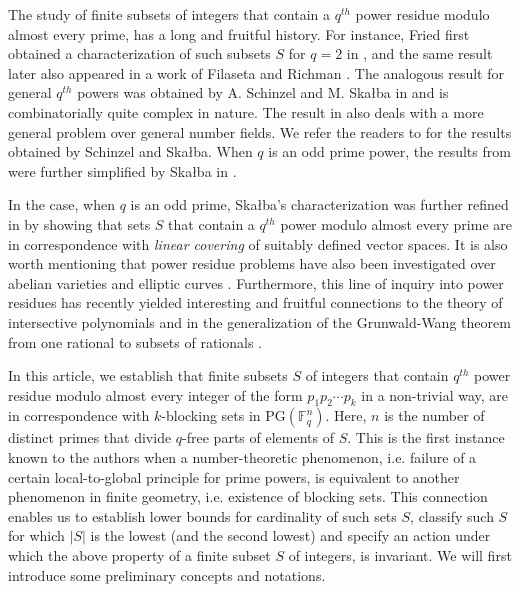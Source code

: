 \documentclass[12pt]{amsart}
\newcommand{\PG}{\mathrm{PG}}
\begin{document}
The study of finite subsets of integers that contain a $q^{th}$ power residue modulo almost every prime, has a long and fruitful history. For instance, Fried first obtained a characterization of such subsets $S$ for $q = 2$ in \cite{fried1969arithmetical}, and the same result later also appeared in a work of Filaseta and Richman \cite{filaseta1989sets}. The analogous result for general $q^{th}$ powers was obtained by A. Schinzel and M. Skałba in \cite{SS} and is combinatorially quite complex in nature. The result in \cite{SS} also deals with a more general problem over general number fields. We refer the readers to \cite[Theorems 1, 2]{SS} for the results obtained by Schinzel and Skałba. When $q$ is an odd prime power, the results from \cite{SS} were further simplified by Skałba in \cite{skalba2005sets}. 

In the case, when $q$ is an odd prime, Skałba's characterization was further refined in \cite{mishra2023prime} by showing that sets $S$ that contain a $q^{th}$ power modulo almost every prime are in correspondence with \textit{linear covering} of suitably defined vector spaces.  It is also worth mentioning that power residue problems have also been investigated over abelian varieties \cite{wong2000power} and elliptic curves \cite{skalba2004power}. Furthermore, this line of inquiry into power residues has recently yielded interesting and fruitful connections to the theory of intersective polynomials \cite{mishra2024polynomials} and in the generalization of the Grunwald-Wang theorem from one rational to subsets of rationals \cite{mishra2024generalization}.

In this article, we establish that finite subsets $S$ of integers that contain $q^{th}$ power residue modulo almost every integer of the form $p_{1}p_{2} \cdots p_{k}$ in a non-trivial way, are in correspondence with $k$-blocking sets in $\PG(\mathbb{F}_{q}^{n})$. Here, $n$ is the number of distinct primes that divide $q$-free parts of elements of $S$. This is the first instance known to the authors when a number-theoretic phenomenon, i.e. failure of a certain local-to-global principle for prime powers, is equivalent to another phenomenon in finite geometry, i.e. existence of blocking sets. This connection enables us to establish lower bounds for cardinality of such sets $S$, classify such $S$ for which $|S|$ is the lowest (and the second lowest) and specify an action under which the above property of a finite subset $S$ of integers, is invariant. We will first introduce some preliminary concepts and notations.
\end{document}

